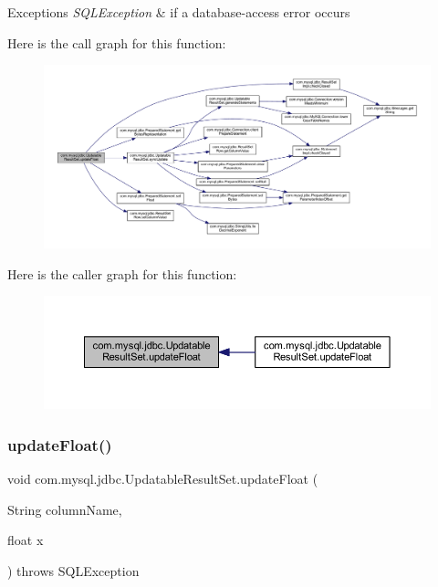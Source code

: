 \begin{DoxyExceptions}{Exceptions}
{\em S\+Q\+L\+Exception} & if a database-\/access error occurs \\
\hline
\end{DoxyExceptions}
Here is the call graph for this function\+:
\nopagebreak
\begin{figure}[H]
\begin{center}
\leavevmode
\includegraphics[width=350pt]{classcom_1_1mysql_1_1jdbc_1_1_updatable_result_set_ac6b973ec7d85c1a9ef8d3376931a8dd2_cgraph}
\end{center}
\end{figure}
Here is the caller graph for this function\+:
\nopagebreak
\begin{figure}[H]
\begin{center}
\leavevmode
\includegraphics[width=350pt]{classcom_1_1mysql_1_1jdbc_1_1_updatable_result_set_ac6b973ec7d85c1a9ef8d3376931a8dd2_icgraph}
\end{center}
\end{figure}
\mbox{\label{classcom_1_1mysql_1_1jdbc_1_1_updatable_result_set_a530db511bea6cfb6177fad010a3aa32a}} 
\subsubsection{\texorpdfstring{update\+Float()}{updateFloat()}\hspace{0.1cm}{\footnotesize\ttfamily [2/2]}}
{\footnotesize\ttfamily void com.\+mysql.\+jdbc.\+Updatable\+Result\+Set.\+update\+Float (\begin{DoxyParamCaption}\item[{String}]{column\+Name,  }\item[{float}]{x }\end{DoxyParamCaption}) throws S\+Q\+L\+Exception}

